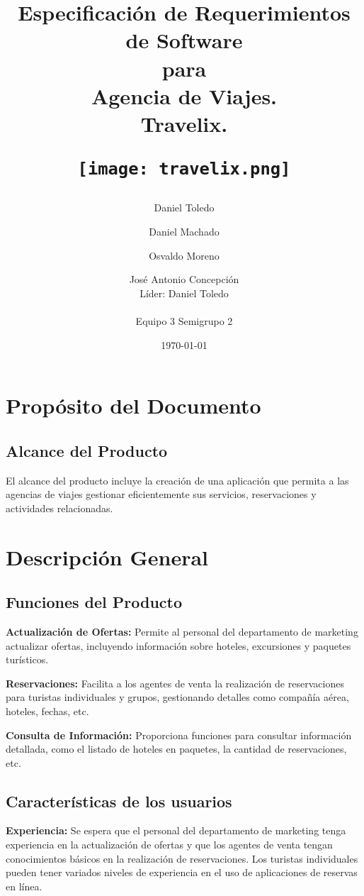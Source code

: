 \documentclass{article}
\title{\huge{Especificación de Requerimientos de Software \\ para \\ Agencia de Viajes. \\ Travelix.}

\texttt{[image: travelix.png]}
}
\author{Daniel Toledo \and Daniel Machado \and Osvaldo Moreno \and José Antonio Concepción \\ Líder: Daniel Toledo \\ \\ Equipo 3 Semigrupo 2}
\date{\today}
\begin{document}
\maketitle
\thispagestyle{empty}
\newpage

\tableofcontents
\newpage

\section{Propósito del Documento}

\subsection{Alcance del Producto}
El alcance del producto incluye la creación de una aplicación que permita a las agencias 
de viajes gestionar eficientemente sus servicios, reservaciones y actividades relacionadas.
\section{Descripción General}

\subsection{Funciones del Producto}
    \textbf{Actualización de Ofertas:}
        Permite al personal del departamento de marketing actualizar ofertas, incluyendo 
        información sobre hoteles, excursiones y paquetes turísticos.

    \textbf{Reservaciones:}
        Facilita a los agentes de venta la realización de reservaciones para turistas 
        individuales y grupos, gestionando detalles como compañía aérea, hoteles, fechas, etc.

    \textbf{Consulta de Información:}
        Proporciona funciones para consultar información detallada, como el listado de hoteles 
        en paquetes, la cantidad de reservaciones, etc.

\subsection{Características de los usuarios}
    \textbf{Experiencia:}
        Se espera que el personal del departamento de marketing tenga experiencia en la actualización 
        de ofertas y que los agentes de venta tengan conocimientos básicos en la realización de 
        reservaciones. Los turistas individuales pueden tener variados niveles de experiencia en 
        el uso de aplicaciones de reservas en línea.
\end{document}
